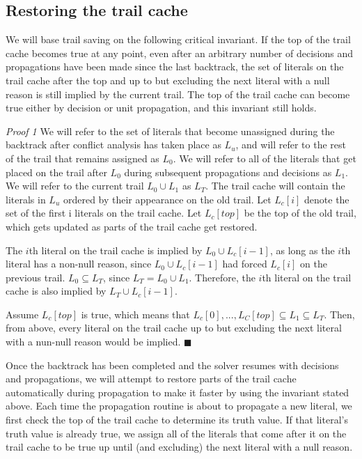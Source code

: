 \documentclass[runningheads]{llncs}
\begin{document}
\subsection{Restoring the trail cache}
We will base trail saving on the following critical invariant. If the
top of the trail cache becomes true at any point, even after an
arbitrary number of decisions and propagations have been made since
the last backtrack, the set of literals on the trail cache after the
top and up to but excluding the next literal with a null reason is
still implied by the current trail. The top of the trail cache can
become true either by decision or unit propagation, and this invariant
still holds.\newline

\textit{Proof 1} We will refer to the set of literals that become
unassigned during the backtrack after conflict analysis has taken
place as $L_u$, and will refer to the rest of the trail that remains
assigned as $L_0$. We will refer to all of the literals that get
placed on the trail after $L_0$ during subsequent propagations and
decisions as $L_1$. We will refer to the current trail $L_0 \cup L_1$
as $L_T$. The trail cache will contain the literals in $L_u$ ordered
by their appearance on the old trail. Let $L_c[i]$ denote the set of
the first i literals on the trail cache. Let $L_c[top]$ be the top of
the old trail, which gets updated as parts of the trail cache get
restored.

The $i$th literal on the trail cache is implied by
$L_0 \cup L_c[i-1]$, as long as the $i$th literal has a non-null
reason, since $L_0 \cup L_c[i-1]$ had forced $L_c[i]$ on the previous
trail. $L_0 \subseteq L_T$, since $L_T = L_0 \cup L_1$. Therefore, the
$i$th literal on the trail cache is also implied by
$L_T \cup L_c[i-1]$.

Assume $L_c[top]$ is true, which means that
$L_c[0], ..., L_C[top] \subseteq L_1 \subseteq L_T$. Then, from above,
every literal on the trail cache up to but excluding the next literal
with a nun-null reason would be implied. $\blacksquare$\newline

Once the backtrack has been completed and the solver resumes with
decisions and propagations, we will attempt to restore parts of the
trail cache automatically during propagation to make it faster by
using the invariant stated above. Each time the propagation routine is
about to propagate a new literal, we first check the top of the trail
cache to determine its truth value. If that literal's truth value is
already true, we assign all of the literals that come after it on the
trail cache to be true up until (and excluding) the next literal with
a null reason.
\end{document}

